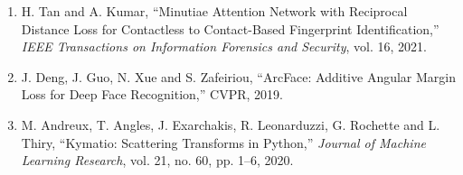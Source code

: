 \documentclass[12pt,a4paper]{article}
\begin{document}
\begin{enumerate}[leftmargin=*]
    \item H. Tan and A. Kumar, ``Minutiae Attention Network with Reciprocal Distance Loss for Contactless to Contact-Based Fingerprint Identification,'' \emph{IEEE Transactions on Information Forensics and Security}, vol. 16, 2021.

    \item J. Deng, J. Guo, N. Xue and S. Zafeiriou, ``ArcFace: Additive Angular Margin Loss for Deep Face Recognition,'' CVPR, 2019.

    \item M. Andreux, T. Angles, J. Exarchakis, R. Leonarduzzi, G. Rochette and L. Thiry, ``Kymatio: Scattering Transforms in Python,'' \emph{Journal of Machine Learning Research}, vol. 21, no. 60, pp. 1--6, 2020.
\end{enumerate}
\end{document}
